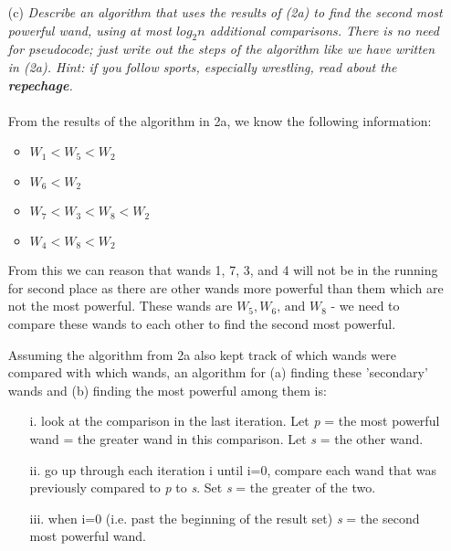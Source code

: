 \documentclass[11pt]{article} \setlength{\oddsidemargin}{0in}
\begin{document}
{\begin{enumerate}
    The base case here is when $\frac{n}{2^i} = 2$, as only one comparison can be made before the algorithm halts (i.e. $T(2) = 1$). The base case occurs when $i = lg(\frac{n}{2})$. 

    Thus the algorithm takes exactly: \\
    \begin{align}
    &T(\frac{n}{2^{lg(\frac{n}{2})}}) + \frac{n}{2} (\frac{1 - (\frac{1}{2})^{lg(\frac{n}{2})}}{1 - \frac{1}{2}}) \\
    &= 1 + \frac{n}{2} (\frac{1 - \frac{2}{n}}{1 - \frac{1}{2}}) \\
    &= 1 + \frac{n}{2} (2 - \frac{4}{n}) \\
    &= n - 1
    \end{align}
    comparisons.

  \newpage
  \item[(c)]{\textit{Describe an algorithm that uses the results of (2a)
        to find the second most powerful wand, using at most $log_2 n$
        additional comparisons. There is no need for pseudocode; just
        write out the steps of the algorithm like we have written in
        (2a). Hint: if you follow sports, especially wrestling, read
        about the \textbf{repechage}.}}
    \\\\
    From the results of the algorithm in 2a, we know the following information: 
    \begin{itemize}
      \item $W_1 < W_5 < W_2$
      \item $W_6 < W_2$
      \item $W_7 < W_3 < W_8 < W_2$
      \item $W_4 < W_8 < W_2$
    \end{itemize}

    From this we can reason that wands 1, 7, 3, and 4 will not be in the running for second place as there are other wands more powerful than them which are not the most powerful. These wands are $W_5, W_6\text{, and }W_8$ - we need to compare these wands to each other to find the second most powerful. 

    Assuming the algorithm from 2a also kept track of which wands were compared with which wands, an algorithm for (a) finding these 'secondary' wands and (b) finding the most powerful among them is:

    \begin{enumerate}
      \item[i.] look at the comparison in the last iteration. Let \textit{p} = the most powerful wand = the greater wand in this comparison. Let \textit{s} = the other wand. 
      \item[ii.] go up through each iteration i until i=0, compare each wand that was previously compared to \textit{p} to \textit{s}. Set \textit{s} = the greater of the two.
      \item[iii.] when i=0 (i.e. past the beginning of the result set) \textit{s} = the second most powerful wand.
    \end{enumerate}


\end{enumerate}}
\end{document}
